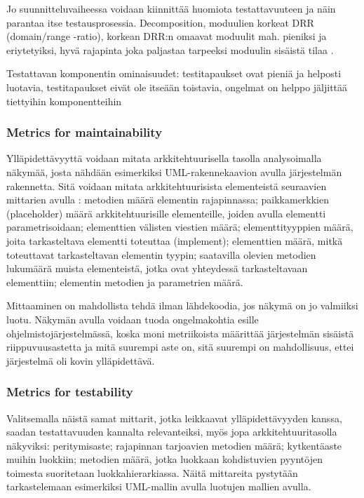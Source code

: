 \documentclass[finnish]{tktltiki2}
\theoremstyle{definition}
\theoremstyle{remark}
\begin{document}
Jo suunnitteluvaiheessa voidaan kiinnittää huomiota testattavuuteen ja näin parantaa itse testausprosessia. Decomposition, moduulien korkeat DRR (domain/range -ratio), korkean DRR:n omaavat moduulit mah. pieniksi ja eriytetyiksi, hyvä rajapinta joka paljastaa tarpeeksi moduulin sisäistä tilaa \citep[s. 117]{voas_improving_1992}.


Testattavan komponentin ominaisuudet: testitapaukset ovat pieniä ja helposti luotavia, testitapaukset eivät ole itseään toistavia, ongelmat on helppo jäljittää tiettyihin komponentteihin \citep[s. 554]{Freedman:1991:TSC:126218.126229}


\subsubsection{Metrics for maintainability}


Ylläpidettävyyttä voidaan mitata arkkitehtuurisella tasolla analysoimalla näkymää, josta nähdään esimerkiksi UML-rakennekaavion avulla järjestelmän rakennetta. Sitä voidaan mitata arkkitehtuurisista elementeistä seuraavien mittarien avulla \citep[s. 3]{bengtsson1998towards}: metodien määrä elementin rajapinnassa; paikkamerkkien (placeholder) määrä arkkitehtuurisille elementeille, joiden avulla elementti parametrisoidaan; elementtien välisten viestien määrä; elementtityyppien määrä, joita tarkasteltava elementti toteuttaa (implement); elementtien määrä, mitkä toteuttavat tarkasteltavan elementin tyypin; saatavilla olevien metodien lukumäärä muista elementeistä, jotka ovat yhteydessä tarkasteltavaan elementtiin; elementin metodien ja parametrien määrä. 

Mittaaminen on mahdollista tehdä ilman lähdekoodia, jos näkymä on jo valmiiksi luotu. Näkymän avulla voidaan tuoda ongelmakohtia esille ohjelmistojärjestelmässä, koska moni metriikoista määrittää järjestelmän sisäistä riippuvuusastetta ja mitä suurempi aste on, sitä suurempi on mahdollisuus, ettei järjestelmä oli kovin ylläpidettävä.

\subsubsection{Metrics for testability}


Valitsemalla näistä samat mittarit, jotka leikkaavat ylläpidettävyyden kanssa, saadan testattavuuden kannalta relevanteiksi, myös jopa arkkitehtuuritasolla näkyviksi: peritymisaste; rajapinnan tarjoavien metodien määrä; kytkentäaste muihin luokkiin; metodien määrä, jotka luokkaan kohdistuvien pyyntöjen toimesta suoritetaan luokkahierarkiassa. Näitä mittareita pystytään tarkastelemaan esimerkiksi UML-mallin avulla luotujen mallien avulla. 
\end{document}
